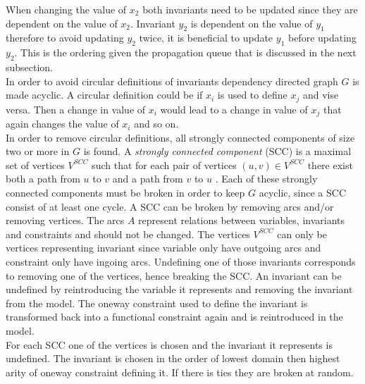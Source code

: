 When changing the value of $x_2$ both invariants need to be updated since they are dependent on the value of $x_2$. 
Invariant $y_2$ is dependent on the value of $y_1$ therefore to avoid updating $y_2$ twice, it is beneficial to 
update $y_1$ before updating $y_2$. This is the ordering given the propagation queue that is discussed in the next 
subsection. \medskip \\
In order to avoid circular definitions of invariants dependency directed graph $G$ is made acyclic. A circular 
definition could be if $x_i$ is used to define $x_j$ and vise versa. Then a change in value of $x_i$ would lead to a 
change in value of $x_j$ that again changes the value of $x_i$ and so on.  \\ 
In order to remove circular definitions, all strongly connected components of size two or more in $G$ is found. A 
\emph{strongly connected component} (SCC) is a maximal set of vertices $V^{SCC}$ such that for each pair of vertices 
$(u,v) \in V^{SCC}$ there exist both a path from $u$ to $v$ and a path from $v$ to $u$ \cite[p. 1170]{cormen}. 
Each of these strongly connected components must be broken in order to keep $G$ acyclic, since a SCC consist of at 
least one cycle. A SCC can be broken by removing arcs and/or removing vertices. The arcs $A$ represent relations 
between variables, invariants and constraints and should not be changed. The vertices $V^{SCC}$ can only be vertices 
representing invariant since variable only have outgoing arcs and constraint only have ingoing arcs. Undefining one of 
those invariants corresponds to removing one of the vertices, hence breaking the SCC. An invariant can be undefined by 
reintroducing the variable it represents and removing the invariant from the model. The oneway constraint used to 
define the invariant is transformed back into a functional constraint again and is reintroduced in the model. \\
For each SCC one of the vertices is chosen and the invariant it represents is undefined. The invariant is chosen in the 
order of lowest domain then highest arity of oneway constraint defining it. If there is ties they are broken at random.
